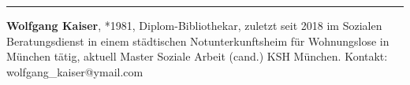 \begin{center}\rule{0.5\linewidth}{0.5pt}\end{center}

\textbf{Wolfgang Kaiser}, *1981, Diplom-Bibliothekar, zuletzt seit 2018
im Sozialen Beratungsdienst in einem städtischen Notunterkunftsheim für
Wohnungslose in München tätig, aktuell Master Soziale Arbeit (cand.) KSH
München. Kontakt: wolfgang\_kaiser@ymail.com
